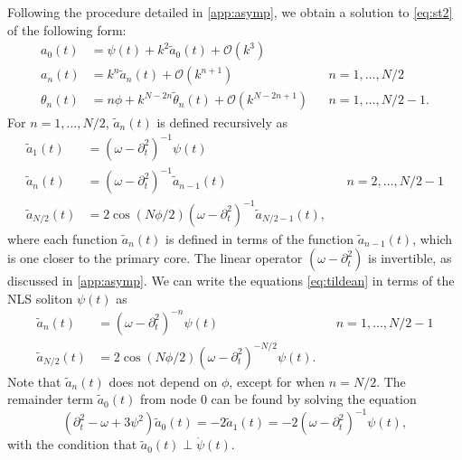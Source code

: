 \documentclass[11pt,reqno]{amsart}
\begin{document}
Following the procedure detailed in \cref{app:asymp}, we obtain a solution to \cref{eq:st2} of the following form:
\begin{equation}\label{eq:asympsol}
\begin{aligned}
a_0(t) &= \psi(t) + k^2 \tilde{a}_0(t) + \mathcal{O}(k^3) \\
a_n(t) &= k^n \tilde{a}_n(t) + \mathcal{O}(k^{n+1}) && n = 1, \dots, N/2 \\
\theta_n(t) &= n \phi + k^{N - 2n} \tilde{\theta}_n(t) 
+ \mathcal{O}(k^{N - 2n+1}) && n = 1, \dots, N/2-1.
\end{aligned}
\end{equation}
For $n = 1, \dots, N/2$, $\tilde{a}_n(t)$ is defined recursively as 
\begin{equation}\label{eq:tildean}
\begin{aligned}
\tilde{a}_1(t) &= (\omega - \partial_t^2)^{-1} \psi(t) \\
\tilde{a}_n(t) &= (\omega - \partial_t^2)^{-1} \tilde{a}_{n-1}(t) && n = 2, \dots, N/2-1 \\
\tilde{a}_{N/2}(t) &= 2 \cos( N\phi/2)(\omega - \partial_t^2)^{-1} \tilde{a}_{N/2-1}(t),
\end{aligned}
\end{equation}
where each function $\tilde{a}_n(t)$ is defined in terms of the function $\tilde{a}_{n-1}(t)$, which is one closer to the primary core. The linear operator $(\omega - \partial_t^2)$ is invertible, as discussed in \cref{app:asymp}. We can write the equations \cref{eq:tildean} in terms of the NLS soliton $\psi(t)$ as
\begin{equation}\label{eq:tildeanpsi}
\begin{aligned}
\tilde{a}_n(t) &= (\omega - \partial_t^2)^{-n} \psi(t) && n = 1, \dots, N/2-1 \\
\tilde{a}_{N/2}(t) &= 2 \cos( N\phi/2)(\omega - \partial_t^2)^{-N/2} \psi(t).
\end{aligned}
\end{equation}
Note that $\tilde{a}_n(t)$ does not depend on $\phi$, except for when $n=N/2$. The remainder term $\tilde{a}_0(t)$ from node 0 can be found by solving the equation
\begin{equation}\label{eq:tildea0eq}
\left( \partial_t^2 - \omega + 3 \psi^2 \right) \tilde{a}_0(t) = -2 \tilde{a}_1(t) =
-2 (\omega - \partial_t^2)^{-1} \psi(t),
\end{equation}
with the condition that $\tilde{a}_0(t) \perp \dot \psi(t)$.
\end{document}

